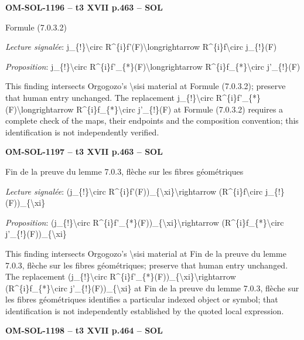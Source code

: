\par\noindent\textbf{OM-SOL-1196 -- t3 XVII p.463 -- SOL}\par
Formule (7.0.3.2)\par
\emph{Lecture signalée}: j\_\{!\}\textbackslash{}circ R\textasciicircum{}\{i\}f'(F)\textbackslash{}longrightarrow R\textasciicircum{}\{i\}f\textbackslash{}circ j\_\{!\}(F)\par
\emph{Proposition}: j\_\{!\}\textbackslash{}circ R\textasciicircum{}\{i\}f'\_\{*\}(F)\textbackslash{}longrightarrow R\textasciicircum{}\{i\}f\_\{*\}\textbackslash{}circ j'\_\{!\}(F)\par
This finding intersects Orgogozo's \textbackslash{}sisi material at Formule (7.0.3.2); preserve that human entry unchanged. The replacement j\_\{!\}\textbackslash{}circ R\textasciicircum{}\{i\}f'\_\{*\}(F)\textbackslash{}longrightarrow R\textasciicircum{}\{i\}f\_\{*\}\textbackslash{}circ j'\_\{!\}(F) at Formule (7.0.3.2) requires a complete check of the maps, their endpoints and the composition convention; this identification is not independently verified.\par
\par\noindent\textbf{OM-SOL-1197 -- t3 XVII p.463 -- SOL}\par
Fin de la preuve du lemme 7.0.3, flèche sur les fibres géométriques\par
\emph{Lecture signalée}: (j\_\{!\}\textbackslash{}circ R\textasciicircum{}\{i\}f'(F))\_\{\textbackslash{}xi\}\textbackslash{}rightarrow (R\textasciicircum{}\{i\}f\textbackslash{}circ j\_\{!\}(F))\_\{\textbackslash{}xi\}\par
\emph{Proposition}: (j\_\{!\}\textbackslash{}circ R\textasciicircum{}\{i\}f'\_\{*\}(F))\_\{\textbackslash{}xi\}\textbackslash{}rightarrow (R\textasciicircum{}\{i\}f\_\{*\}\textbackslash{}circ j'\_\{!\}(F))\_\{\textbackslash{}xi\}\par
This finding intersects Orgogozo's \textbackslash{}sisi material at Fin de la preuve du lemme 7.0.3, flèche sur les fibres géométriques; preserve that human entry unchanged. The replacement (j\_\{!\}\textbackslash{}circ R\textasciicircum{}\{i\}f'\_\{*\}(F))\_\{\textbackslash{}xi\}\textbackslash{}rightarrow (R\textasciicircum{}\{i\}f\_\{*\}\textbackslash{}circ j'\_\{!\}(F))\_\{\textbackslash{}xi\} at Fin de la preuve du lemme 7.0.3, flèche sur les fibres géométriques identifies a particular indexed object or symbol; that identification is not independently established by the quoted local expression.\par
\par\noindent\textbf{OM-SOL-1198 -- t3 XVII p.464 -- SOL}\par
